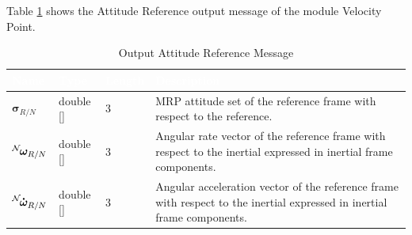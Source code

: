 \documentclass[]{AVSSimReportMemo}
\begin{document}
Table \ref{tab:outputTable} shows the Attitude Reference output message of the module Velocity Point.
\begin{table}[h!]
	\centering
	\caption{Output Attitude Reference Message}
	\begin{tabular}{|l|l|l|p{3in}|}
		\hline
		\rowcolor{BrickRed}
		\textcolor{white}{Name} & \textcolor{white}{Type} & 
		\textcolor{white}{Length} & 
		\textcolor{white}{Description}  \\ \hline
		$\bm{\sigma}_{R/N}$ & double [] & 3 & 
		MRP attitude set of the reference frame with respect to the reference. \\ \hline
		$\leftexp{N} {\bm{\omega}_{R/N}}$ & double [] & 3 & 
		Angular rate vector of the reference frame with respect to the inertial expressed in inertial frame components. \\ \hline
		$\leftexp{N} {\bm{\dot{\omega}}_{R/N}}$ & double [] & 3 & 
		Angular acceleration vector of the reference frame with respect to the inertial expressed in inertial frame components. \\ \hline
	\end{tabular}
	\label{tab:outputTable}
\end{table}
\newpage
\end{document}
